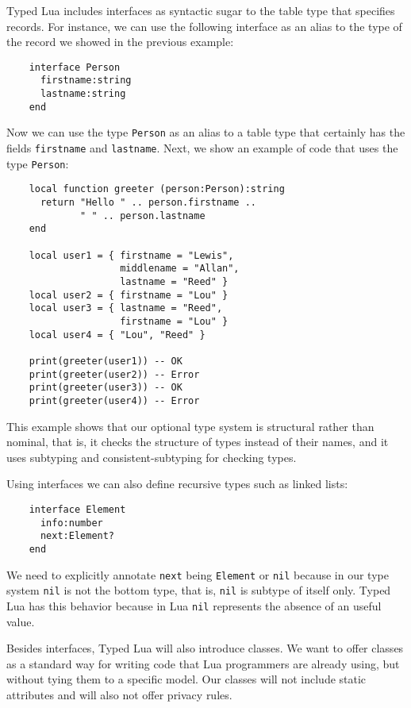 \documentclass[preprint]{sig-alternate}
\begin{document}
Typed Lua includes interfaces as syntactic sugar to the table type
that specifies records.
For instance, we can use the following interface as an alias to the
type of the record we showed in the previous example:
\begin{verbatim}
    interface Person
      firstname:string
      lastname:string
    end
\end{verbatim}

Now we can use the type \verb'Person' as an alias to a table type
that certainly has the fields \verb'firstname' and \verb'lastname'.
Next, we show an example of code that uses the type \verb'Person':
\begin{verbatim}
    local function greeter (person:Person):string
      return "Hello " .. person.firstname ..
             " " .. person.lastname
    end

    local user1 = { firstname = "Lewis",
                    middlename = "Allan",
                    lastname = "Reed" }
    local user2 = { firstname = "Lou" }
    local user3 = { lastname = "Reed",
                    firstname = "Lou" }
    local user4 = { "Lou", "Reed" }

    print(greeter(user1)) -- OK
    print(greeter(user2)) -- Error
    print(greeter(user3)) -- OK
    print(greeter(user4)) -- Error
\end{verbatim}

This example shows that our optional type system is structural rather
than nominal, that is, it checks the structure of types instead of
their names, and it uses subtyping and consistent-subtyping for
checking types.

Using interfaces we can also define recursive types such as linked
lists:

\begin{verbatim}
    interface Element
      info:number
      next:Element?
    end
\end{verbatim}

We need to explicitly annotate \verb'next' being \verb'Element'
or \verb'nil' because in our type system \verb'nil' is not the
bottom type, that is, \verb'nil' is subtype of itself only.
Typed Lua has this behavior because in Lua \verb'nil' represents
the absence of an useful value.

Besides interfaces, Typed Lua will also introduce classes.
We want to offer classes as a standard way for writing code that
Lua programmers are already using, but without tying them to a
specific model.
Our classes will not include static attributes and will also not offer
privacy rules.
\end{document}
